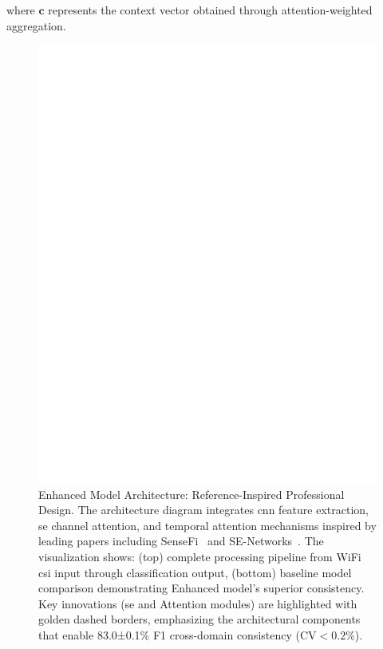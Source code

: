 \documentclass[journal]{IEEEtran}
\begin{document}
where $\mathbf{c}$ represents the context vector obtained through attention-weighted aggregation.

\begin{figure}[ht]
\centering
\includegraphics[width=\columnwidth]{figures/figure5_enhanced_3d_arch_basic.pdf}
\caption{Enhanced Model Architecture: Reference-Inspired Professional Design. The architecture diagram integrates \gls{cnn} feature extraction, \gls{se} channel attention, and temporal attention mechanisms inspired by leading papers including SenseFi~\cite{yang2023sensefi} and SE-Networks~\cite{se_networks2018}. The visualization shows: (top) complete processing pipeline from WiFi \gls{csi} input through classification output, (bottom) baseline model comparison demonstrating Enhanced model's superior consistency. Key innovations (\gls{se} and Attention modules) are highlighted with golden dashed borders, emphasizing the architectural components that enable 83.0±0.1\% F1 cross-domain consistency ($\text{CV}<0.2\%$).}
\label{fig:enhanced_3d_arch}
\end{figure}
\end{document}
